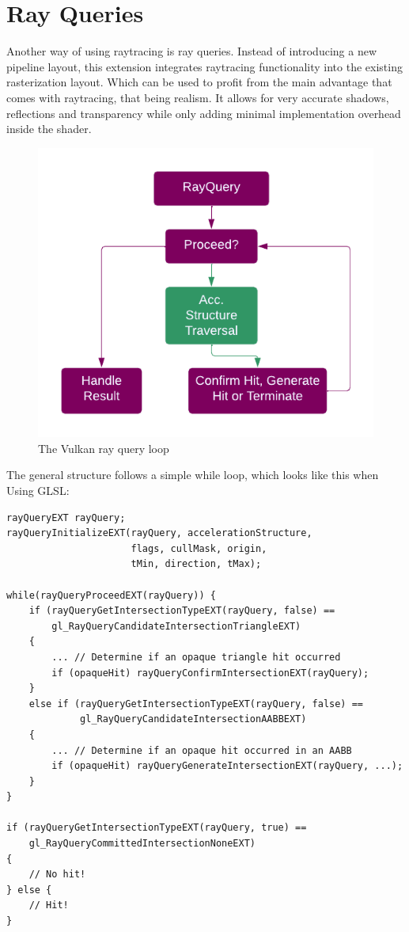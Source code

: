 \section{Ray Queries}
\label{sec:VkRayQuery}
Another way of using raytracing is ray queries. Instead of introducing a new pipeline layout, this extension integrates raytracing functionality into the existing rasterization layout. Which can be used to profit from the main advantage that comes with raytracing, that being realism. It allows for very accurate shadows, reflections and transparency while only adding minimal implementation overhead inside the shader.
\begin{figure}
    \centering
    \includegraphics[width=.6\textwidth]{images/showcase/RayQuery.pdf}
    \caption{The Vulkan ray query loop \cite{vulkanRayTracing}}
    \label{fig:VkRayQuery}
\end{figure}
The general structure follows a simple while loop, which looks like this when Using GLSL:

\begin{lstlisting}
rayQueryEXT rayQuery;
rayQueryInitializeEXT(rayQuery, accelerationStructure,
                      flags, cullMask, origin, 
                      tMin, direction, tMax);

while(rayQueryProceedEXT(rayQuery)) {
    if (rayQueryGetIntersectionTypeEXT(rayQuery, false) ==
        gl_RayQueryCandidateIntersectionTriangleEXT)
    {
        ... // Determine if an opaque triangle hit occurred
        if (opaqueHit) rayQueryConfirmIntersectionEXT(rayQuery);
    }
    else if (rayQueryGetIntersectionTypeEXT(rayQuery, false) ==
             gl_RayQueryCandidateIntersectionAABBEXT)
    {
        ... // Determine if an opaque hit occurred in an AABB
        if (opaqueHit) rayQueryGenerateIntersectionEXT(rayQuery, ...);    
    }
}

if (rayQueryGetIntersectionTypeEXT(rayQuery, true) ==
    gl_RayQueryCommittedIntersectionNoneEXT)
{
    // No hit!
} else {
    // Hit!
}
\end{lstlisting}
\cite{vulkanRayTracing}

